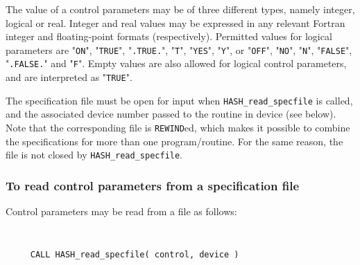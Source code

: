 \documentclass{galahad}
\newcommand{\packagename}{HASH}
\begin{document}
The value of a control parameters may be of three different types, namely
integer, logical or real.
Integer and real values may be expressed in any relevant Fortran integer and
floating-point formats (respectively). Permitted values for logical
parameters are "{\tt ON}", "{\tt TRUE}", "{\tt .TRUE.}", "{\tt T}",
"{\tt YES}", "{\tt Y}", or "{\tt OFF}", "{\tt NO}",
"{\tt N}", "{\tt FALSE}", "{\tt .FALSE.}" and "{\tt F}".
Empty values are also allowed for
logical control parameters, and are interpreted as "{\tt TRUE}".

The specification file must be open for
input when {\tt \packagename\_read\_specfile}
is called, and the associated device number
passed to the routine in device (see below).
Note that the corresponding
file is {\tt REWIND}ed, which makes it possible to combine the specifications
for more than one program/routine.  For the same reason, the file is not
closed by {\tt \packagename\_read\_specfile}.

\subsubsection{To read control parameters from a specification file}
\label{readspec}

Control parameters may be read from a file as follows:
\hskip0.5in
\def\baselinestretch{0.8} {\tt
\begin{verbatim}
     CALL HASH_read_specfile( control, device )
\end{verbatim}
}
\def\baselinestretch{1.0}
\end{document}

